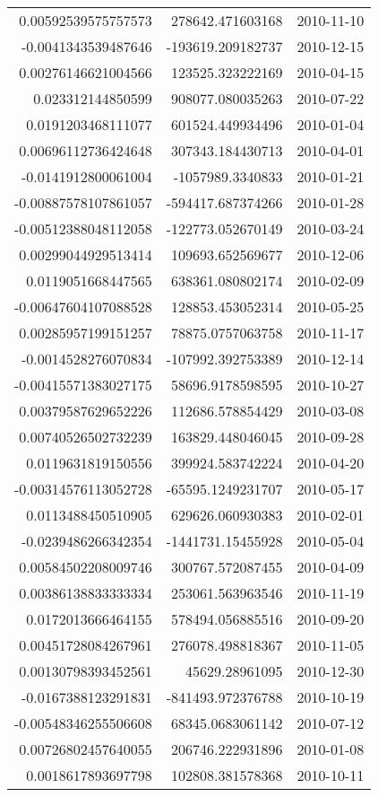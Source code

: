 \begin{tabular}{r | r | l}
0.00592539575757573 & 278642.471603168 & 2010-11-10 \\
-0.0041343539487646 & -193619.209182737 & 2010-12-15 \\
0.00276146621004566 & 123525.323222169 & 2010-04-15 \\
0.023312144850599 & 908077.080035263 & 2010-07-22 \\
0.0191203468111077 & 601524.449934496 & 2010-01-04 \\
0.00696112736424648 & 307343.184430713 & 2010-04-01 \\
-0.0141912800061004 & -1057989.3340833 & 2010-01-21 \\
-0.00887578107861057 & -594417.687374266 & 2010-01-28 \\
-0.00512388048112058 & -122773.052670149 & 2010-03-24 \\
0.00299044929513414 & 109693.652569677 & 2010-12-06 \\
0.0119051668447565 & 638361.080802174 & 2010-02-09 \\
-0.00647604107088528 & 128853.453052314 & 2010-05-25 \\
0.00285957199151257 & 78875.0757063758 & 2010-11-17 \\
-0.0014528276070834 & -107992.392753389 & 2010-12-14 \\
-0.00415571383027175 & 58696.9178598595 & 2010-10-27 \\
0.00379587629652226 & 112686.578854429 & 2010-03-08 \\
0.00740526502732239 & 163829.448046045 & 2010-09-28 \\
0.0119631819150556 & 399924.583742224 & 2010-04-20 \\
-0.00314576113052728 & -65595.1249231707 & 2010-05-17 \\
0.0113488450510905 & 629626.060930383 & 2010-02-01 \\
-0.0239486266342354 & -1441731.15455928 & 2010-05-04 \\
0.00584502208009746 & 300767.572087455 & 2010-04-09 \\
0.00386138833333334 & 253061.563963546 & 2010-11-19 \\
0.0172013666464155 & 578494.056885516 & 2010-09-20 \\
0.00451728084267961 & 276078.498818367 & 2010-11-05 \\
0.00130798393452561 & 45629.28961095 & 2010-12-30 \\
-0.0167388123291831 & -841493.972376788 & 2010-10-19 \\
-0.00548346255506608 & 68345.0683061142 & 2010-07-12 \\
0.00726802457640055 & 206746.222931896 & 2010-01-08 \\
0.0018617893697798 & 102808.381578368 & 2010-10-11 \\
\end{tabular}

